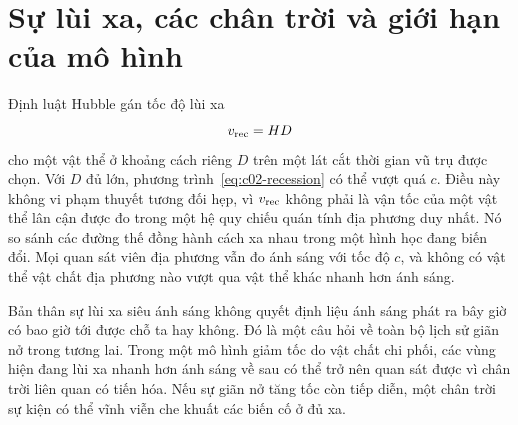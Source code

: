 \section{Sự lùi xa, các chân trời và giới hạn của mô hình}

Định luật Hubble gán tốc độ lùi xa
\begin{equation}
v_{\rm rec}=HD
\label{eq:c02-recession}
\end{equation}
cho một vật thể ở khoảng cách riêng \(D\) trên một lát cắt thời gian vũ trụ được chọn. Với \(D\) đủ lớn, phương trình~\eqref{eq:c02-recession} có thể vượt quá \(c\). Điều này không vi phạm thuyết tương đối hẹp, vì \(v_{\rm rec}\) không phải là vận tốc của một vật thể lân cận được đo trong một hệ quy chiếu quán tính địa phương duy nhất. Nó so sánh các đường thế đồng hành cách xa nhau trong một hình học đang biến đổi. Mọi quan sát viên địa phương vẫn đo ánh sáng với tốc độ \(c\), và không có vật thể vật chất địa phương nào vượt qua vật thể khác nhanh hơn ánh sáng.

\begin{classroomqa}
\end{classroomqa}

Bản thân sự lùi xa siêu ánh sáng không quyết định liệu ánh sáng phát ra bây giờ có bao giờ tới được chỗ ta hay không. Đó là một câu hỏi về toàn bộ lịch sử giãn nở trong tương lai. Trong một mô hình giảm tốc do vật chất chi phối, các vùng hiện đang lùi xa nhanh hơn ánh sáng về sau có thể trở nên quan sát được vì chân trời liên quan có tiến hóa. Nếu sự giãn nở tăng tốc còn tiếp diễn, một chân trời sự kiện có thể vĩnh viễn che khuất các biến cố ở đủ xa.

\begin{classroomqa}
\end{classroomqa}

